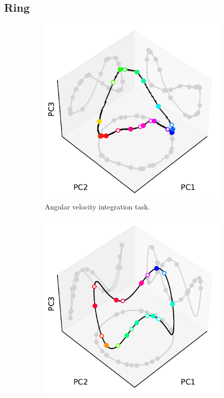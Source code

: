 \documentclass{article}
\newcounter{ct}
\theoremstyle{definition}
\theoremstyle{remark}
\begin{document}
\subsection{Ring}
\begin{figure}[htbp]
    \centering
    \begin{subfigure}[b]{0.45\textwidth}
        \centering
        \includegraphics[width=\textwidth]{figures/angular_N100_recttanh_slow_manifold_3d2d}
        \caption{Angular velocity integration task.}
        \label{fig:slowangular}
    \end{subfigure}
    \quad
    \begin{subfigure}[b]{0.45\textwidth}
        \centering
            \includegraphics[width=\textwidth]{figures/centerout_N100_tanh_slow_manifold_3d2d.pdf}

\end{subfigure}
\end{figure}
\end{document}
